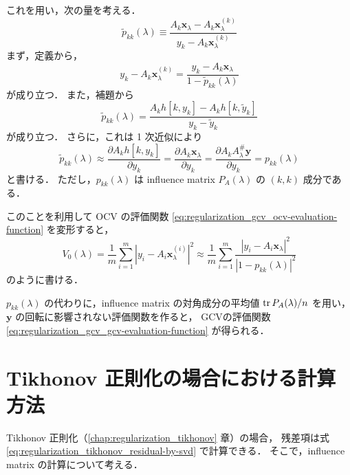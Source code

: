 これを用い，次の量を考える．
\begin{equation}
    \tilde{p}_{kk}(\lambda)
    \equiv \frac{A_k \bm{x}_\lambda - A_k \bm{x}_\lambda^{(k)}}
    {y_k - A_k \bm{x}_\lambda^{(k)}}
\end{equation}
まず，定義から，
\begin{equation}
    y_k - A_k \bm{x}_\lambda^{(k)} =
    \frac{y_k - A_k \bm{x}_\lambda}{1 - \tilde{p}_{kk}(\lambda)}
\end{equation}
が成り立つ．
また，補題から
\begin{equation}
    \tilde{p}_{kk}(\lambda)
    = \frac{A_k h[k,y_k] - A_k h[k,\tilde{y}_k]}{y_k - \tilde{y}_k}
\end{equation}
が成り立つ．
さらに，これは 1 次近似により
\begin{equation}
    \tilde{p}_{kk}(\lambda)
    \approx \frac{\partial A_k h[k,y_k]}{\partial y_k}
    =\frac{\partial A_k \bm{x}_\lambda}{\partial y_k}
    =\frac{\partial A_k A_\lambda^\# \bm{y}}{\partial y_k}
    =p_{kk}(\lambda)
\end{equation}
と書ける．
ただし，$p_{kk}(\lambda)$ は
influence matrix $P_A(\lambda)$ の $(k,k)$ 成分である．

このことを利用して OCV の評価関数
\eqref{eq:regularization_gcv_ocv-evaluation-function}
を変形すると，
\begin{equation}
    V_0(\lambda)=
    \frac{1}{m} \sum_{i=1}^m
    \left|y_i - A_i \bm{x}_\lambda^{(i)}\right|^2
    \approx
    \frac{1}{m} \sum_{i=1}^m
    \frac{\left|y_i - A_i \bm{x}_\lambda\right|^2}
    {\left|1 - p_{kk}(\lambda)\right|^2}
\end{equation}
のように書ける．

$p_{kk}(\lambda)$
の代わりに，influence matrix の対角成分の平均値
$\operatorname{tr} P_A(\lambda)/n$
を用い，
$\bm{y}$
の回転に影響されない評価関数を作ると，
GCVの評価関数 \eqref{eq:regularization_gcv_gcv-evaluation-function} が得られる．

\section{Tikhonov 正則化の場合における計算方法}

Tikhonov 正則化（\ref{chap:regularization_tikhonov} 章）の場合，
残差項は式 \eqref{eq:regularization_tikhonov_residual-by-svd} で計算できる．
そこで，influence matrix の計算について考える．

